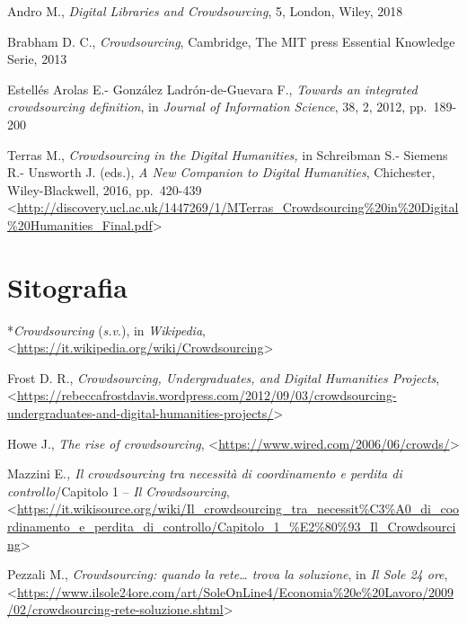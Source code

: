 \documentclass[
  b5paper,
  twoside,
  11pt,
  chapterprefix=false,
  bibliography=totocnumbered,
  listof=flat]{scrbook}
\begin{document}
Andro M., \emph{Digital Libraries and Crowdsourcing}, 5, London, Wiley, 2018

Brabham D. C., \emph{Crowdsourcing}, Cambridge, The MIT press Essential
Knowledge Serie, 2013

Estellés Arolas E.- González Ladrón-de-Guevara F., \emph{Towards an
integrated crowdsourcing definition}, in \emph{Journal of Information
Science}, 38, 2, 2012, pp.~189-200

Terras M., \emph{Crowdsourcing in the Digital Humanities,} in Schreibman S.-
Siemens R.- Unsworth J. (eds.), \emph{A New Companion to Digital Humanities},
Chichester, Wiley-Blackwell, 2016, pp.~420-439
\textless{}\href{http://discovery.ucl.ac.uk/1447269/1/MTerras_Crowdsourcing\%20in\%20Digital\%20Humanities_Final.pdf}{{http://discovery.ucl.ac.uk/1447269/1/MTerras\_Crowdsourcing\%20in\%20Digital\%20Humanities\_Final.pdf}}\textgreater{}

\hypertarget{sitografia-5}{%
\section*{Sitografia}\label{sitografia-5}}

*\emph{Crowdsourcing} (\emph{s.v}.), in \emph{Wikipedia},
\textless{}{\url{https://it.wikipedia.org/wiki/Crowdsourcing}\textgreater{}}

Frost D. R., \emph{Crowdsourcing, Undergraduates, and Digital Humanities
Projects},
\textless{}{\url{https://rebeccafrostdavis.wordpress.com/2012/09/03/crowdsourcing-undergraduates-and-digital-humanities-projects/}\textgreater{}}

Howe J., \emph{The rise of crowdsourcing},
\textless{}{\url{https://www.wired.com/2006/06/crowds/}\textgreater{}}

Mazzini E.\emph{, Il crowdsourcing tra necessità di coordinamento e perdita
di controllo}/Capitolo 1 -- \emph{Il Crowdsourcing},
\textless{}{\href{https://it.wikisource.org/wiki/Il_crowdsourcing_tra_necessità_di_coordinamento_e_perdita_di_controllo/Capitolo_1_–_Il_Crowdsourcing}{https://it.wikisource.org/wiki/Il\_crowdsourcing\_tra\_necessit\%C3\%A0\_di\_coordinamento\_e\_perdita\_di\_controllo/Capitolo\_1\_\%E2\%80\%93\_Il\_Crowdsourcing}\textgreater{}}

Pezzali M., \emph{Crowdsourcing: quando la rete\ldots{} trova la soluzione}, in
\emph{Il Sole 24 ore},
\textless{}{\url{https://www.ilsole24ore.com/art/SoleOnLine4/Economia\%20e\%20Lavoro/2009/02/crowdsourcing-rete-soluzione.shtml}\textgreater{}}
\end{document}
